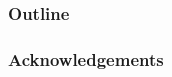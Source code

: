 \documentclass{bmtslides}
\title{}
\author{}
\institute{}
\date{\today} %
\begin{document}
\frame{\titlepage}

\begin{frame}
\frametitle{Outline}

\end{frame}

\begin{frame}
\frametitle{Acknowledgements}

\end{frame}

\end{document}
